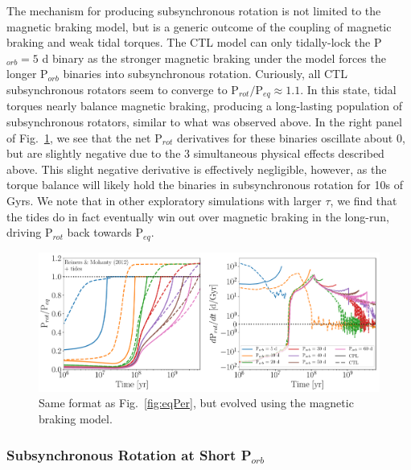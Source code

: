 \documentclass[twocolumn]{aastex61}
\begin{document}
The mechanism for producing subsynchronous rotation is not limited to the \citet{Matt2015} magnetic braking model, but is a generic outcome of the coupling of magnetic braking and weak tidal torques. The CTL model can only tidally-lock the P$_{orb} = 5$ d binary as the stronger magnetic braking under the \citet{Reiners2012} model forces the longer P$_{orb}$ binaries into subsynchronous rotation. Curiously, all CTL subsynchronous rotators seem to converge to P$_{rot}/$P$_{eq} \approx 1.1$.  In this state, tidal torques nearly balance magnetic braking, producing a long-lasting population of subsynchronous rotators, similar to what was observed above.  In the right panel of Fig.~\ref{fig:eqPerReiners}, we see that the net P$_{rot}$ derivatives for these binaries oscillate about 0, but are slightly negative due to the 3 simultaneous physical effects described above. This slight negative derivative is effectively negligible, however, as the torque balance will likely hold the binaries in subsynchronous rotation for 10s of Gyrs.  We note that in other exploratory simulations with larger $\tau$, we find that the tides do in fact eventually win out over magnetic braking in the long-run, driving P$_{rot}$ back towards P$_{eq}$.

\begin{figure}
	\includegraphics[width=\textwidth]{../Plots/eqPerTwoPanelReiners.pdf}
   \caption{Same format as Fig.~\ref{fig:eqPer}, but evolved using the \citet{Reiners2012} magnetic braking model.}%
    \label{fig:eqPerReiners}%
\end{figure}

\subsubsection{Subsynchronous Rotation at Short P$_{orb}$}
\end{document}

